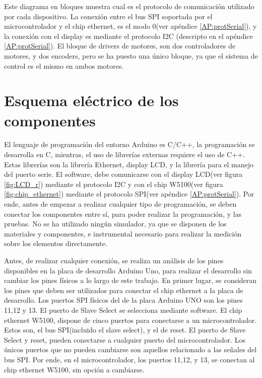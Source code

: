 Este diagrama en bloques muestra cual es el protocolo de comunicación utilizado por cada dispositivo. La conexión entre el bus SPI soportada por el microcontrolador y el chip ethernet, es el modo 0(ver apéndice \ref{AP:protSerial}), y la conexión con el display es mediante el protocolo I2C (descripto en el apéndice \ref{AP:protSerial}). El bloque de drivers de motores, son dos controladores de motores, y dos encoders, pero se ha puesto una único bloque, ya que el sistema de control es el mismo en ambos motores. 

\section{Esquema eléctrico de los componentes}
El lenguaje de programación del entorno Arduino es C/C++, la programación se desarrolla en C, mientras, el uso de librerías externas requiere el uso de C++. Estas librerías son la librería Ethernet, display LCD, y la librería para el manejo del puerto serie. El software, debe comunicarse con el display LCD(ver figura \ref{fig:LCD_r}) mediante el protocolo I2C y con el chip W5100(ver figura \ref{fig:chip_ethernet}) mediante el protocolo SPI(ver apéndice \ref{AP:protSerial}). Por ende, antes de empezar a realizar cualquier tipo de programación, se deben conectar los componentes entre sí, para poder realizar la programación, y las pruebas. No se ha utilizado ningún simulador, ya que se disponen de los materiales y componentes, e instrumental necesario para realizar la medición sobre los elementos directamente.  

Antes, de realizar cualquier conexión, se realiza un análisis de los pines disponibles en la placa de desarrollo Arduino Uno, para realizar el desarrollo sin cambiar los pines físicos a lo largo de este trabajo. En primer lugar, se consideran los pines que deben ser utilizados para conectar el chip ethernet a la placa de desarrollo. Los puertos SPI físicos del de la placa Arduino UNO son los pines 11,12 y 13. El puerto de Slave Select se selecciona mediante software. El chip ethernet W5100, dispone de cinco puertos para conectarse a un microcontrolador. Estos son, el bus SPI(incluido el slave select), y el de reset. El puerto de Slave Select y reset, pueden conectarse a cualquier puerto del microcontrolador. Los únicos puertos que no pueden cambiarse son aquellos relacionado a las señales del bus SPI. Por ende, en el microcontrolador, los puertos 11,12, y 13, se conectan al chip ethernet W5100, sin opción a cambiarse.    

